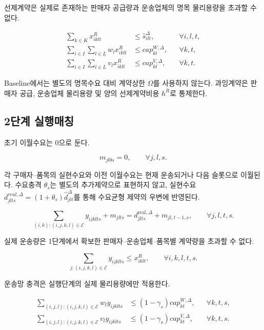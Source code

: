 \documentclass[11pt,a4paper]{article}
\newcommand{\Eset}{\mathcal E}
\begin{document}
선제계약은 실제로 존재하는 판매자 공급량과 운송업체의 명목 물리용량을 초과할 수 없다.

\begin{align}
\sum_{k\in K}x^R_{iklt}
&\le
\hat s^\Delta_{ilt},
&&\forall i,l,t,
\label{eq:pre-supply}\\
\sum_{i\in I}\sum_{l\in L}w_lx^R_{iklt}
&\le
cap^{W,\Delta}_{kt},
&&\forall k,t,
\label{eq:pre-weight}\\
\sum_{i\in I}\sum_{l\in L}v_lx^R_{iklt}
&\le
cap^{V,\Delta}_{kt},
&&\forall k,t.
\label{eq:pre-volume}
\end{align}

Baseline에서는 별도의 명목수요 대비 계약상한 $\Omega$를 사용하지 않는다.
과잉계약은 판매자 공급, 운송업체 물리용량 및 양의 선제계약비용 $h^R$로 통제한다.

\subsection{2단계 실행매칭}

초기 이월수요는 0으로 둔다.

\begin{equation}
m_{jl0s}=0,
\qquad \forall j,l,s.
\label{eq:init-backlog}
\end{equation}

각 구매자--품목의 실현수요와 이전 이월수요는 현재 운송되거나 다음 슬롯으로 이월된다. 수요충격 \(\theta_s\)는 별도의 추가제약으로 표현하지 않고, 실현수요 \(d^{real,\Delta}_{jlts}=(1+\theta_s)\hat d^\Delta_{jlt}\)를 통해 수요균형 제약의 우변에 반영된다.

\begin{equation}
\sum_{(i,k):(i,j,k,l)\in\Eset}y_{ijklts}
+m_{jlts}
=
d^{\mathrm{real},\Delta}_{jlts}
+m_{jl,t-1,s},
\qquad
\forall j,l,t,s.
\label{eq:demand-balance}
\end{equation}

실제 운송량은 1단계에서 확보한 판매자--운송업체--품목별 계약량을 초과할 수 없다.

\begin{equation}
\sum_{j:(i,j,k,l)\in\Eset}y_{ijklts}
\le x^R_{iklt},
\qquad
\forall i,k,l,t,s.
\label{eq:contract-use}
\end{equation}

운송망 충격은 실행단계의 실제 물리용량에만 적용한다.

\begin{align}
\sum_{(i,j,l):(i,j,k,l)\in\Eset}w_ly_{ijklts}
&\le
(1-\gamma_s)cap^{W,\Delta}_{kt},
&&\forall k,t,s,
\label{eq:run-weight}\\
\sum_{(i,j,l):(i,j,k,l)\in\Eset}v_ly_{ijklts}
&\le
(1-\gamma_s)cap^{V,\Delta}_{kt},
&&\forall k,t,s.
\label{eq:run-volume}
\end{align}
\end{document}
